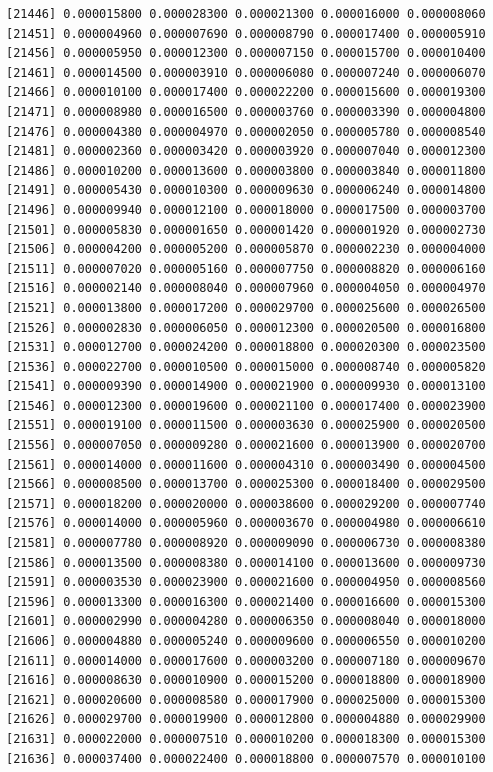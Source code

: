 \documentclass[]{article}
\begin{document}
\begin{verbatim}
[21446] 0.000015800 0.000028300 0.000021300 0.000016000 0.000008060
[21451] 0.000004960 0.000007690 0.000008790 0.000017400 0.000005910
[21456] 0.000005950 0.000012300 0.000007150 0.000015700 0.000010400
[21461] 0.000014500 0.000003910 0.000006080 0.000007240 0.000006070
[21466] 0.000010100 0.000017400 0.000022200 0.000015600 0.000019300
[21471] 0.000008980 0.000016500 0.000003760 0.000003390 0.000004800
[21476] 0.000004380 0.000004970 0.000002050 0.000005780 0.000008540
[21481] 0.000002360 0.000003420 0.000003920 0.000007040 0.000012300
[21486] 0.000010200 0.000013600 0.000003800 0.000003840 0.000011800
[21491] 0.000005430 0.000010300 0.000009630 0.000006240 0.000014800
[21496] 0.000009940 0.000012100 0.000018000 0.000017500 0.000003700
[21501] 0.000005830 0.000001650 0.000001420 0.000001920 0.000002730
[21506] 0.000004200 0.000005200 0.000005870 0.000002230 0.000004000
[21511] 0.000007020 0.000005160 0.000007750 0.000008820 0.000006160
[21516] 0.000002140 0.000008040 0.000007960 0.000004050 0.000004970
[21521] 0.000013800 0.000017200 0.000029700 0.000025600 0.000026500
[21526] 0.000002830 0.000006050 0.000012300 0.000020500 0.000016800
[21531] 0.000012700 0.000024200 0.000018800 0.000020300 0.000023500
[21536] 0.000022700 0.000010500 0.000015000 0.000008740 0.000005820
[21541] 0.000009390 0.000014900 0.000021900 0.000009930 0.000013100
[21546] 0.000012300 0.000019600 0.000021100 0.000017400 0.000023900
[21551] 0.000019100 0.000011500 0.000003630 0.000025900 0.000020500
[21556] 0.000007050 0.000009280 0.000021600 0.000013900 0.000020700
[21561] 0.000014000 0.000011600 0.000004310 0.000003490 0.000004500
[21566] 0.000008500 0.000013700 0.000025300 0.000018400 0.000029500
[21571] 0.000018200 0.000020000 0.000038600 0.000029200 0.000007740
[21576] 0.000014000 0.000005960 0.000003670 0.000004980 0.000006610
[21581] 0.000007780 0.000008920 0.000009090 0.000006730 0.000008380
[21586] 0.000013500 0.000008380 0.000014100 0.000013600 0.000009730
[21591] 0.000003530 0.000023900 0.000021600 0.000004950 0.000008560
[21596] 0.000013300 0.000016300 0.000021400 0.000016600 0.000015300
[21601] 0.000002990 0.000004280 0.000006350 0.000008040 0.000018000
[21606] 0.000004880 0.000005240 0.000009600 0.000006550 0.000010200
[21611] 0.000014000 0.000017600 0.000003200 0.000007180 0.000009670
[21616] 0.000008630 0.000010900 0.000015200 0.000018800 0.000018900
[21621] 0.000020600 0.000008580 0.000017900 0.000025000 0.000015300
[21626] 0.000029700 0.000019900 0.000012800 0.000004880 0.000029900
[21631] 0.000022000 0.000007510 0.000010200 0.000018300 0.000015300
[21636] 0.000037400 0.000022400 0.000018800 0.000007570 0.000010100

\end{verbatim}
\end{document}
